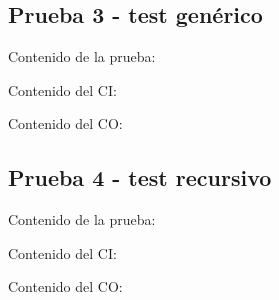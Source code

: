 \documentclass[11pt, , a4paper, titlepage]{article}
\newenvironment{changemargin}[2]{%
\begin{list}{}{%
\setlength{\topsep}{0pt}%
\setlength{\leftmargin}{#1}%
\setlength{\rightmargin}{#2}%
\setlength{\listparindent}{\parindent}%
\setlength{\itemindent}{\parindent}%
\setlength{\parsep}{\parskip}%
}%
\item[]}{\end{list}}
\begin{document}
\clearpage

\subsection{Prueba 3 - test genérico}
\vspace{2mm}
Contenido de la prueba:
\vspace{2mm}
\begin{changemargin}{+3cm}{+2cm}
    
\end{changemargin} 
\vspace{2mm}
Contenido del CI:
\vspace{2mm}
\begin{changemargin}{+1cm}{+0cm}
    
\end{changemargin} 
\vspace{2mm}
Contenido del CO:
\vspace{2mm}
\begin{changemargin}{+1cm}{-2cm}
    
\end{changemargin} 

\clearpage

\subsection{Prueba 4 - test recursivo}
\vspace{2mm}
Contenido de la prueba:
\vspace{2mm}
\begin{changemargin}{+3cm}{+2cm}
    
\end{changemargin} 
\vspace{2mm}
Contenido del CI:
\vspace{2mm}
\begin{changemargin}{+1cm}{+0cm}
    
\end{changemargin} 
\vspace{2mm}
Contenido del CO:
\vspace{2mm}
\begin{changemargin}{+1cm}{-2cm}
    
\end{changemargin} 
\end{document}
